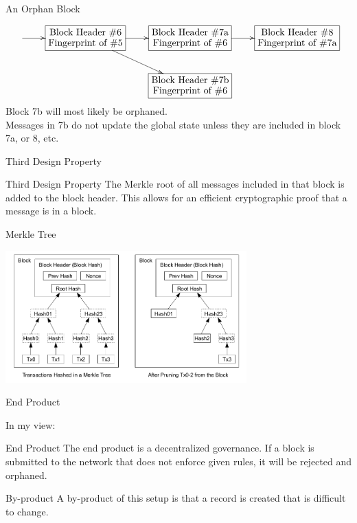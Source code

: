 \documentclass{beamer}
\begin{document}
\begin{frame}{An Orphan Block}


   \[
  \xymatrix{
    \ar[r] &  *+[F]{\txt{Block Header \#6\\ Fingerprint of \#5 
     }} \ar[r] \ar[dr]& *+[F]{\txt{Block Header \#7a\\ Fingerprint of \#6 
     }}  \ar[r] & *+[F]{\txt{Block Header \#8\\ Fingerprint of \#7a 
     }} \\ & & *+[F]{\txt{Block Header \#7b\\ Fingerprint of \#6 
     }}}
  
  \]
  \pause
  Block 7b will most likely be orphaned. \\
  \pause
  Messages in 7b do not update the global state unless they are included in block 7a, or 8, etc.

\end{frame}

\begin{frame}{Third Design Property}
  \begin{block}{Third Design Property}
    The Merkle root of all messages included in that block
    is added to the block header.  This allows for an efficient cryptographic
    proof that a message is in a block.
  \end{block}

\end{frame}

\begin{frame}{Merkle Tree}

\begin{center}
  \includegraphics[height=2in]{MerkleTree.png}
\end{center}

  
\end{frame}



\begin{frame}{End Product}

In my view:
  
  \begin{block}{End Product}
    The end product is a decentralized governance.  If a block is submitted to the network that does not enforce
    given rules, it will be rejected and orphaned.
  \end{block}

\pause
  
  \begin{block}{By-product}
    A by-product of this setup is that a record is created that is difficult to change.
  \end{block}

  
\end{frame}
\end{document}
